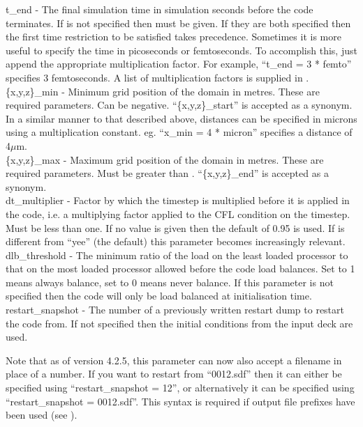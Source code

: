 {\emphtext t\_end} - The final simulation time in simulation seconds before the
code terminates. If  is not specified then
 must be given. If they are both specified then
the first time restriction to be satisfied takes precedence. Sometimes it is
more useful to specify the time in picoseconds or femtoseconds. To accomplish
this, just append the appropriate multiplication factor. For example,
``t\_end = 3 * femto'' specifies 3 femtoseconds. A list of multiplication
factors is supplied in .\\

{\emphtext \{x,y,z\}\_min} - Minimum grid position of the domain in
metres. These are required parameters. Can be negative. ``\{x,y,z\}\_start''
is accepted as a synonym. In a similar manner to that described above,
distances can be specified in microns using a multiplication constant.
eg. ``x\_min = 4 * micron'' specifies a distance of 4$\mu$m.\\

{\emphtext \{x,y,z\}\_max} - Maximum grid position of the domain in
metres. These are required parameters. Must be greater than
.  ``\{x,y,z\}\_end'' is accepted as a synonym.\\

{\emphtext dt\_multiplier} - Factor by which the timestep is multiplied before
it is applied in the code, i.e. a multiplying factor applied to the CFL
condition on the timestep. Must be less than one. If no value is given then
the default of 0.95 is used. If  is different from
``yee'' (the default) this parameter becomes increasingly relevant.\\

{\emphtext dlb\_threshold} - The minimum ratio of the
load on the least loaded processor to that on the most loaded processor allowed
before the code load balances. Set to 1 means
always balance, set to 0 means never balance. If this parameter is not
specified then the code will only be load balanced at initialisation time.\\

{\emphtext restart\_snapshot} - The number of a previously written restart
dump to restart the code from. If not specified then the initial conditions
from the input deck are used.

Note that as of version 4.2.5, this parameter can now also accept a filename
in place of a number.
If you want to restart from ``0012.sdf'' then it can either be
specified using ``restart\_snapshot = 12'', or alternatively it can be
specified using ``restart\_snapshot = 0012.sdf''. This syntax is required
if output file prefixes have been used (see ).\\

